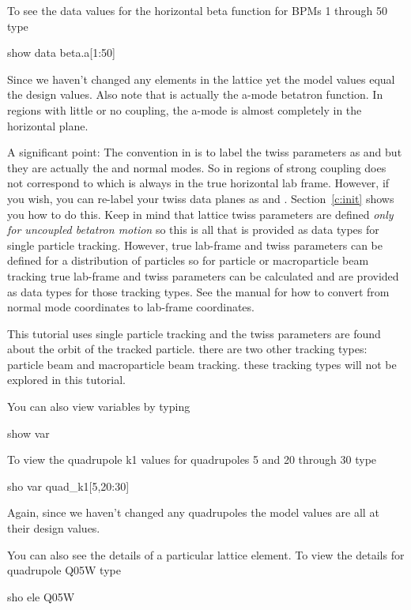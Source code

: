 To see the data values for the horizontal beta function for \cesr BPMs
1 through 50 type
\begin{example}
  show data beta.a[1:50]
\end{example}
Since we haven't changed any elements in the lattice yet the model
values equal the design values. Also note that  is actually
the a-mode betatron function. In regions with little or no coupling,
the a-mode is almost completely in the horizontal plane.

A significant point: The convention in \bmad is to label the twiss
parameters as  and  but they are actually the  and
 normal modes. So in regions of strong coupling  does
not correspond to  which is always in the true horizontal
lab frame.  However, if you wish, you can re-label your twiss data
planes as  and .  Section~\ref{c:init} shows you how to do
this. Keep in mind that lattice twiss parameters are defined
\textit{only for uncoupled betatron motion} so this is all that is
provided as data types for single particle tracking.  However, true
lab-frame  and  twiss parameters can be defined for a
distribution of particles so for particle or macroparticle beam
tracking true lab-frame  and  twiss parameters can be
calculated and are provided as data types for those tracking
types. See the \bmad manual for how to convert from normal mode
coordinates to lab-frame coordinates.

This tutorial uses single particle tracking and the twiss parameters
are found about the orbit of the tracked particle. there are two other
tracking types: particle beam and macroparticle beam tracking. these
tracking types will not be explored in this tutorial.

You can also view variables by typing
\begin{example}
  show var
\end{example}
To view the quadrupole k1 values for \cesr quadrupoles 5 and 20
through 30 type
\begin{example}
  sho var quad\_k1[5,20:30]
\end{example}
Again, since we haven't changed any quadrupoles the model values are
all at their design values.

You can also see the details of a particular lattice element. To view
the details for quadrupole Q05W type
\begin{example}
  sho ele Q05W
\end{example}

